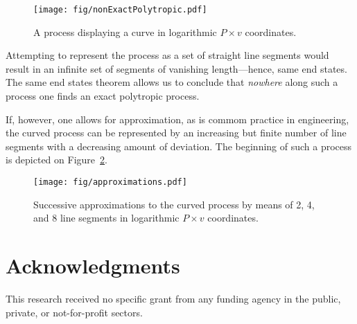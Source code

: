 \documentclass[fleqn,10pt]{SelfArx}
\begin{document}
    \begin{figure}[ht]
        \centering
        \texttt{[image: fig/nonExactPolytropic.pdf]}
        \caption{A process displaying a curve in logarithmic $P\times v$ coordinates.}
        \label{fig:non.exact}
    \end{figure}

    Attempting to represent the process as a set of straight line segments would  result  in  an
    infinite set of segments of vanishing length---hence, same end states. The same  end  states
    theorem allows us to conclude that \emph{nowhere} along such a process one  finds  an  exact
    polytropic process.

    If, however, one allows for approximation, as is commom practice in engineering, the  curved
    process can be represented by an increasing but  finite  number  of  line  segments  with  a
    decreasing amount of deviation. The beginning of such a process is depicted on
    Figure~\ref{fig:approx}.

    \begin{figure}[ht]
        \centering
        \texttt{[image: fig/approximations.pdf]}
        \caption{Successive approximations to the curved process by means of 2, 4,  and  8  line
            segments in logarithmic $P\times v$ coordinates.}
        \label{fig:approx}
    \end{figure}

\section*{Acknowledgments}

    This research received no specific grant from any funding agency in the public, private,  or
    not-for-profit sectors.





\end{document}
